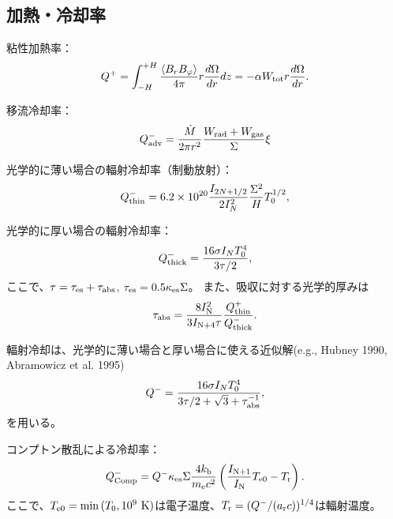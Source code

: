 \documentclass[11pt, oneside]{article}   	%
\begin{document}
\subsection{加熱・冷却率}
粘性加熱率：
\begin{equation}
	Q^+ = \int^{+H}_{-H} \frac{\langle B_rB_\varphi \rangle}{4\pi} r\frac{d\Omega}{dr} dz = -\alpha W_{\rm tot}r\frac{d\Omega}{dr}.
\end{equation}

移流冷却率：
\begin{equation}
	Q^-_{\rm adv} = \frac{\dot{M}}{2\pi r^2} \frac{W_{\rm rad}+W_{\rm gas}}{\Sigma}\xi
\end{equation}

光学的に薄い場合の輻射冷却率（制動放射）：
\begin{equation}
	Q^-_{\rm thin} = 6.2\times10^{20}\frac{I_{2N+1/2}}{2I_N^2}\frac{\Sigma^2}{H}T_0^{1/2},
\end{equation}

光学的に厚い場合の輻射冷却率：
\begin{equation}
	Q^-_{\rm thick} = \frac{16\sigma I_NT_0^4}{3\tau/2},
\end{equation}
ここで、$\tau=\tau_{\rm es}+\tau_{\rm abs}$, $\tau_{\rm es}=0.5\kappa_{\rm es}\Sigma$。
また、吸収に対する光学的厚みは
\begin{equation}
	\tau_{\rm abs} = \frac{8I_{\rm N}^2}{3I_{\rm N+4}\tau}\frac{Q^+_{\rm thin}}{Q^-_{\rm thick}}.
\end{equation}

輻射冷却は、光学的に薄い場合と厚い場合に使える近似解(e.g., Hubney 1990, Abramowicz et al. 1995)
\begin{equation}
	Q^- = \frac{16\sigma I_N T^4_0}{3\tau/2 + \sqrt{3} + \tau_{\rm abs}^{-1}},
\end{equation}
を用いる。

コンプトン散乱による冷却率：
\begin{equation}
	Q^-_{\rm Comp} = Q^-\kappa_{\rm es}\Sigma\frac{4k_{\rm b}}{m_{\rm e}c^2}\left( \frac{I_{\rm N+1}}{I_{\rm N}}T_{\rm e0} - T_{\rm r}\right).
\end{equation}
ここで、$T_{\rm e0}=\min{(T_0, 10^9\ \rm{K})}$は電子温度、$T_{\rm r} = (Q^-/(a_{\rm r}c))^{1/4}$は輻射温度。
\end{document}
